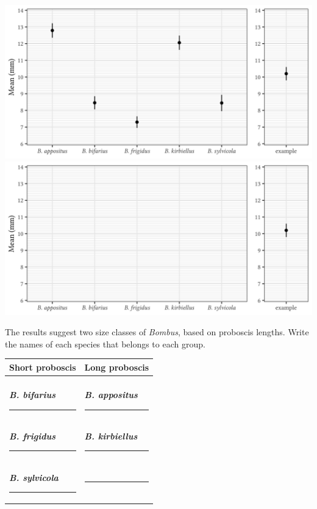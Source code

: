 \documentclass[12pt, hidelinks]{exam}
\begin{document}
\begin{questions}
\ifprintanswers
	\includegraphics[width=\linewidth]{mean_proboscis_plot_key}
\else
	\includegraphics[width=\linewidth]{mean_proboscis_plot_blank}
\fi



\question
The results suggest two size classes of \textit{Bombus}, based on
proboscis lengths.  Write the names of each species that belongs to 
each group.

\begin{tabular}{@{}ll@{}} %
	\toprule
	Short proboscis & Long proboscis \tabularnewline
	\midrule
	& \tabularnewline
	\ifprintanswers \textbf{\textit{B. bifarius}} \else \rule{2in}{0.4pt} \fi &
	\ifprintanswers \textbf{\textit{B. appositus}} \else \rule{2in}{0.4pt} \fi 
	\tabularnewline[2em]
	\ifprintanswers \textbf{\textit{B. frigidus}} \else \rule{2in}{0.4pt} \fi &
	\ifprintanswers \textbf{\textit{B. kirbiellus}} \else \rule{2in}{0.4pt} \fi
	\tabularnewline[2em]
	\ifprintanswers \textbf{\textit{B. sylvicola}} \else \rule{2in}{0.4pt} \fi &
	\rule{1in}{0.4pt} \tabularnewline
	\bottomrule
\end{tabular}


\end{questions}
\end{document}
